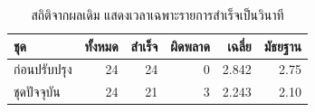 \begin{table}[H]\centering\caption{สถิติจากผลเดิม แสดงเวลาเฉพาะรายการสำเร็จเป็นวินาที}
\begin{tabularx}{\linewidth}{Yrrrrr}\toprule ชุด & ทั้งหมด & สำเร็จ & ผิดพลาด & เฉลี่ย & มัธยฐาน\\\midrule
ก่อนปรับปรุง & 24 & 24 & 0 & 2.842 & 2.75\\
ชุดปัจจุบัน & 24 & 21 & 3 & 2.243 & 2.10\\\bottomrule\end{tabularx}\end{table}